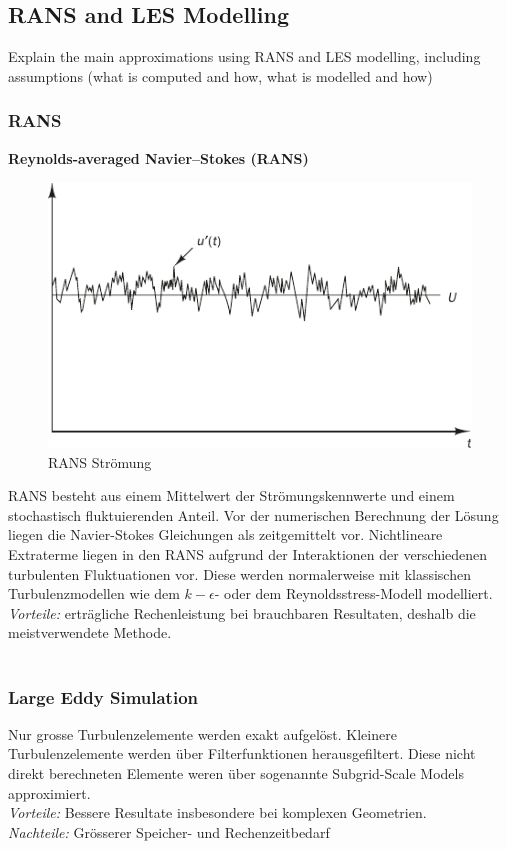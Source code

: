 \documentclass[a4paper]{scrartcl}
\begin{document}
\subsection{RANS and LES Modelling}
Explain the main approximations using RANS
and LES modelling, including assumptions (what is computed and how, what is modelled and how)
\subsubsection{RANS}
\textbf{Reynolds-averaged Navier–Stokes (RANS)}

\begin{figure}[h]
\begin{center}
\includegraphics[scale=1]{images/51.pdf}
\caption{RANS Strömung}
\label{fig:51}
\end{center}
\end{figure}

RANS besteht aus einem Mittelwert der Strömungskennwerte und einem stochastisch
fluktuierenden Anteil. Vor der numerischen Berechnung der Lösung liegen die
Navier-Stokes Gleichungen als zeitgemittelt vor. Nichtlineare Extraterme liegen
in den RANS aufgrund der Interaktionen der verschiedenen turbulenten Fluktuationen vor.
Diese werden normalerweise mit klassischen Turbulenzmodellen wie dem
$k-\epsilon$- oder dem Reynoldsstress-Modell modelliert.
\\
\textit{Vorteile:} erträgliche Rechenleistung bei brauchbaren Resultaten,
deshalb die meistverwendete Methode. \\
\
\subsubsection{Large Eddy Simulation}
Nur grosse Turbulenzelemente werden exakt aufgelöst. Kleinere Turbulenzelemente
werden über Filterfunktionen herausgefiltert. Diese nicht direkt berechneten
Elemente weren über sogenannte Subgrid-Scale Models approximiert. \\
\vspace{0.5cm}
\textit{Vorteile:} Bessere Resultate insbesondere bei komplexen Geometrien. \\
\textit{Nachteile:} Grösserer Speicher- und Rechenzeitbedarf
\end{document}
